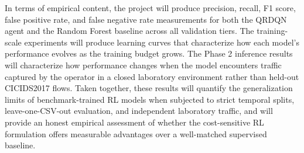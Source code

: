In terms of empirical content, the project will produce precision, recall, F1 score, false positive rate, and false negative rate measurements for both the QRDQN agent and the Random Forest baseline across all validation tiers. The training-scale experiments will produce learning curves that characterize how each model's performance evolves as the training budget grows. The Phase 2 inference results will characterize how performance changes when the model encounters traffic captured by the operator in a closed laboratory environment rather than held-out CICIDS2017 flows. Taken together, these results will quantify the generalization limits of benchmark-trained RL models when subjected to strict temporal splits, leave-one-CSV-out evaluation, and independent laboratory traffic, and will provide an honest empirical assessment of whether the cost-sensitive RL formulation offers measurable advantages over a well-matched supervised baseline.
